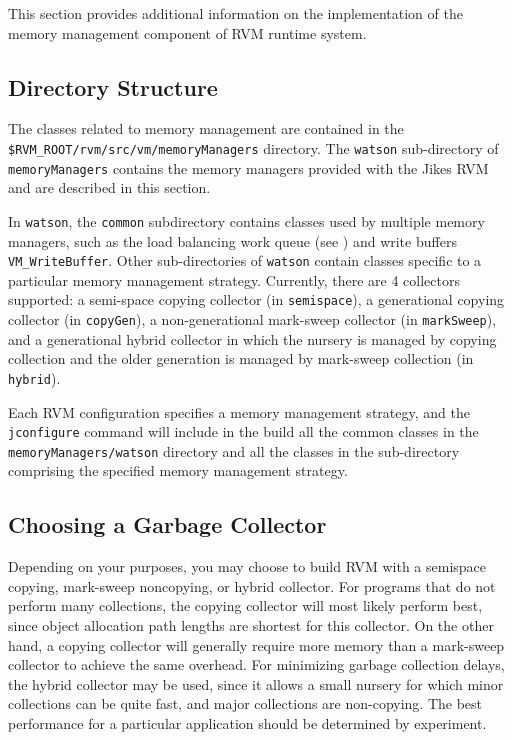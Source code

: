 This section provides additional information on the implementation
of the memory management component of RVM runtime system.
 
\subsection{Directory Structure} \label{sssec:directories}
The classes related to memory management are contained in the 
{\tt \$RVM\_ROOT/rvm/src/vm/memoryManagers}  directory.
The  {\tt watson}  sub-directory of  {\tt memoryManagers}  contains
the memory managers provided with the Jikes RVM
and are described in this section.  

In {\tt watson}, the {\tt common} subdirectory contains classes used by multiple
memory managers, such as the load balancing work queue
(see )
and write buffers {\tt VM\_WriteBuffer}.
Other sub-directories of {\tt watson} 
contain classes specific to a particular memory management strategy.
Currently, there are 4 collectors supported: 
a semi-space copying collector (in {\tt semispace}),
a generational copying collector (in {\tt copyGen}), 
a non-generational mark-sweep collector (in {\tt markSweep}), 
and a generational hybrid collector in which the nursery is managed by copying collection
and the older generation is managed by mark-sweep collection (in {\tt hybrid}).

Each RVM configuration specifies a memory management strategy, 
and the  {\tt jconfigure}   command will include in the build all the
common classes in the {\tt memoryManagers/watson} directory and 
all the classes in the sub-directory comprising the specified memory management strategy.

\subsection{Choosing a Garbage Collector} \label{ssec:choosinggc}
Depending on your purposes, you may choose to build RVM with a
semispace copying, mark-sweep noncopying, or hybrid collector.  For
programs that do not perform many collections, the copying collector
will most likely perform best, since object allocation path lengths
are shortest for this collector.  On the other hand, a copying
collector will generally require more memory than a mark-sweep
collector to achieve the same overhead. For minimizing garbage
collection delays, the hybrid collector may be used, since it allows a
small nursery for which minor collections can be quite fast, and major
collections are non-copying.  The best performance for a particular
application should be determined by experiment.

